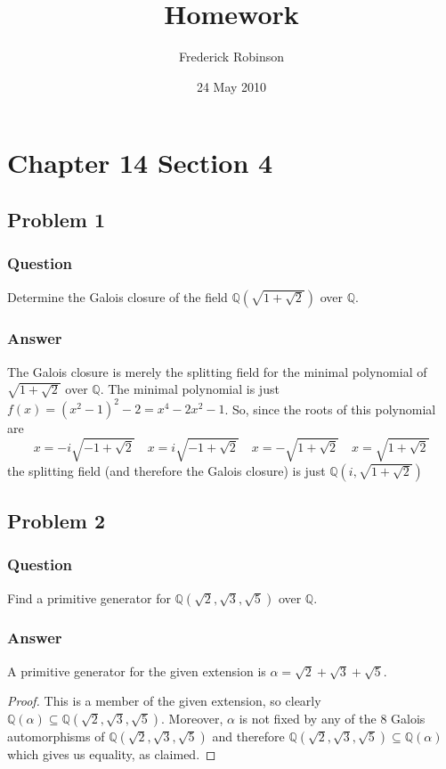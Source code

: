 \documentclass[10pt]{article}
\title{Homework}
\author{Frederick Robinson}
\date{24 May 2010}
\begin{document}

   \maketitle

\setcounter{tocdepth}{2} 


\section{Chapter 14 Section 4}
\subsection{Problem 1}
\subsubsection{Question}
Determine the Galois closure of the field $\mathbb{Q}\left( \sqrt{1+\sqrt2} \right)$ over $\mathbb{Q}$.
\subsubsection{Answer}
The Galois closure is merely the splitting field for the minimal polynomial of $ \sqrt{1+\sqrt2}$ over $\mathbb{Q}$. The minimal polynomial is just $f(x)= (x^2 -1)^2 -2 = x^4-2x^2-1$. So, since the roots of this polynomial are 
\[ x= -i \sqrt{-1+\sqrt{2}}\quad x= i \sqrt{-1+\sqrt{2}}\quad x= -\sqrt{1+\sqrt{2}}\quad x= \sqrt{1+\sqrt{2}}\]
the splitting field (and therefore the Galois closure) is just $\mathbb{Q}(i, \sqrt{1+\sqrt 2})$

\subsection{Problem 2}
\subsubsection{Question}
Find a primitive generator for $\mathbb{Q}(\sqrt2,\sqrt3,\sqrt5)$ over $\mathbb{Q}$.
\subsubsection{Answer}
A primitive generator for the given extension is $\alpha=\sqrt2 + \sqrt 3  + \sqrt 5$. 
\begin{proof}This is a member of the given extension, so clearly $\mathbb{Q}(\alpha) \subseteq \mathbb{Q}(\sqrt2,\sqrt3,\sqrt5) $. Moreover, $\alpha$ is not fixed by any of the 8 Galois automorphisms of $\mathbb{Q}(\sqrt2,\sqrt3,\sqrt5) $ and therefore $\mathbb{Q}(\sqrt2,\sqrt3,\sqrt5) \subseteq \mathbb{Q}(\alpha)$ which gives us equality, as claimed.\end{proof}
\end{document}
